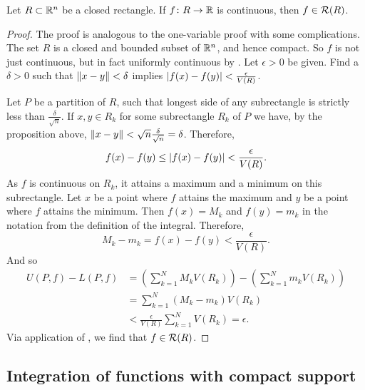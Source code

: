 \begin{thm} \label{mv:thm:contintrect}
Let $R \subset {\mathbb{R}}^n$ be a closed rectangle.
If $f \colon R \to {\mathbb{R}}$ is continuous, then $f \in {\mathcal{R}}(R)$.
\end{thm}

\begin{proof}
The proof is analogous to the one-variable proof with some complications.
The set $R$ is a closed and bounded subset of ${\mathbb{R}}^n$, and hence compact.  So
$f$ is not just continuous, but in fact uniformly continuous 
by .
Let $\epsilon > 0$ be given.  Find a $\delta > 0$ such that
$\lVert {x-y} \rVert < \delta$ implies $\lvert {f(x)-f(y)} \rvert < \frac{\epsilon}{V(R)}$.

Let $P$ be a partition of $R$, such that longest side of any subrectangle
is strictly less than $\frac{\delta}{\sqrt{n}}$.
If $x, y \in R_k$ for some subrectangle $R_k$ of $P$ we have,
by the proposition above,
$\lVert {x-y} \rVert < \sqrt{n} \frac{\delta}{\sqrt{n}} = \delta$.  Therefore,
\begin{equation*}
f(x)-f(y) \leq \lvert {f(x)-f(y)} \rvert < \frac{\epsilon}{V(R)} .
\end{equation*}
As $f$ is continuous on $R_k$, it attains a maximum and a minimum
on this subrectangle.
Let $x$ be a point where $f$ attains the maximum and $y$ be a point
where $f$ attains the minimum.  Then $f(x) = M_k$
and $f(y) = m_k$ in the notation from the definition of the integral.
Therefore,
\begin{equation*}
M_k-m_k = f(x)-f(y) < 
\frac{\epsilon}{V(R)} .
\end{equation*}
And so
\begin{equation*}
\begin{split}
U(P,f) - L(P,f)
& =
\left(
\sum_{k=1}^N
M_k V(R_k)
\right)
-
\left(
\sum_{k=1}^N
m_k V(R_k)
\right)
\\
& =
\sum_{k=1}^N
(M_k-m_k) V(R_k)
\\
& <
\frac{\epsilon}{V(R)}
\sum_{k=1}^N
V(R_k)
= \epsilon.
\end{split}
\end{equation*}
Via application of , we find that $f \in
{\mathcal{R}}(R)$.
\end{proof}

\subsection{Integration of functions with compact support}

